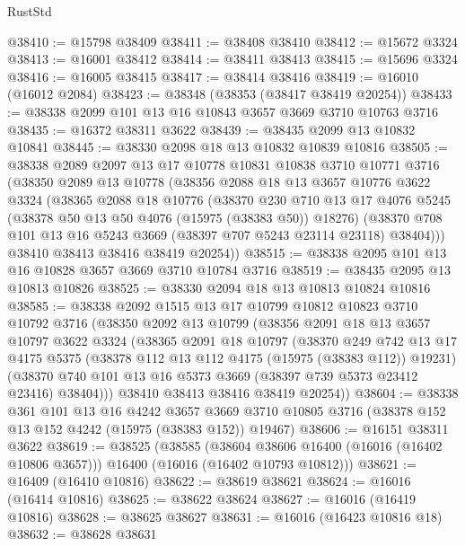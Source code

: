 \begin{lexlean}{RustStd}
\begin{coremodule}
@38410 := @15798 @38409
@38411 := @38408 @38410
@38412 := @15672 @3324
@38413 := @16001 @38412
@38414 := @38411 @38413
@38415 := @15696 @3324
@38416 := @16005 @38415
@38417 := @38414 @38416
@38419 := @16010 (@16012 @2084)
@38423 := @38348 (@38353 (@38417 @38419 @20254))
@38433 := @38338 @2099 @101 @13 @16 @10843 @3657 @3669 @3710 @10763 @3716
@38435 := @16372 @38311 @3622
@38439 := @38435 @2099 @13 @10832 @10841
@38445 := @38330 @2098 @18 @13 @10832 @10839 @10816
@38505 := @38338
    @2089
    @2097
    @13
    @17
    @10778
    @10831
    @10838
    @3710
    @10771
    @3716
    (@38350
      @2089
      @13
      @10778
      (@38356
        @2088
        @18
        @13
        @3657
        @10776
        @3622
        @3324
        (@38365
          @2088
          @18
          @10776
          (@38370
            @230
            @710
            @13
            @17
            @4076
            @5245
            (@38378 @50 @13 @50 @4076 (@15975 (@38383 @50)) @18276)
            (@38370 @708 @101 @13 @16 @5243 @3669 (@38397 @707 @5243 @23114 @23118) @38404)))
        @38410
        @38413
        @38416
        @38419
        @20254))
@38515 := @38338 @2095 @101 @13 @16 @10828 @3657 @3669 @3710 @10784 @3716
@38519 := @38435 @2095 @13 @10813 @10826
@38525 := @38330 @2094 @18 @13 @10813 @10824 @10816
@38585 := @38338
    @2092
    @1515
    @13
    @17
    @10799
    @10812
    @10823
    @3710
    @10792
    @3716
    (@38350
      @2092
      @13
      @10799
      (@38356
        @2091
        @18
        @13
        @3657
        @10797
        @3622
        @3324
        (@38365
          @2091
          @18
          @10797
          (@38370
            @249
            @742
            @13
            @17
            @4175
            @5375
            (@38378 @112 @13 @112 @4175 (@15975 (@38383 @112)) @19231)
            (@38370 @740 @101 @13 @16 @5373 @3669 (@38397 @739 @5373 @23412 @23416) @38404)))
        @38410
        @38413
        @38416
        @38419
        @20254))
@38604 := @38338
    @361
    @101
    @13
    @16
    @4242
    @3657
    @3669
    @3710
    @10805
    @3716
    (@38378 @152 @13 @152 @4242 (@15975 (@38383 @152)) @19467)
@38606 := @16151 @38311 @3622
@38619 := @38525
    (@38585
      (@38604 @38606 @16400 (@16016 (@16402 @10806 @3657)))
      @16400
      (@16016 (@16402 @10793 @10812)))
@38621 := @16409 (@16410 @10816)
@38622 := @38619 @38621
@38624 := @16016 (@16414 @10816)
@38625 := @38622 @38624
@38627 := @16016 (@16419 @10816)
@38628 := @38625 @38627
@38631 := @16016 (@16423 @10816 @18)
@38632 := @38628 @38631

\end{coremodule}
\end{lexlean}
